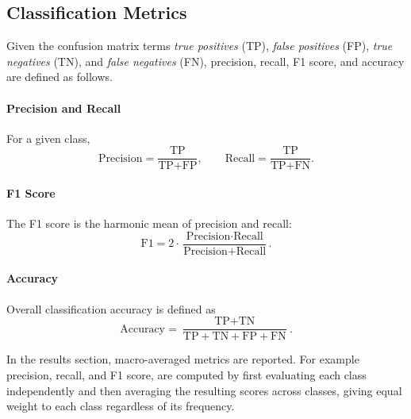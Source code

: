 \subsection{Classification Metrics}
Given the confusion matrix terms \emph{true positives} (TP), \emph{false
positives} (FP), \emph{true negatives} (TN), and \emph{false negatives} (FN),
precision, recall, F1 score, and accuracy are defined as follows.

\paragraph{Precision and Recall} For a given class,
\[
\text{Precision} = \frac{\text{TP}}{\text{TP} + \text{FP}},
\qquad
\text{Recall} = \frac{\text{TP}}{\text{TP} + \text{FN}}.
\]

\paragraph{F1 Score} The F1 score is the harmonic mean of precision and recall:
\[
\text{F1} = 2 \cdot \frac{\text{Precision} \cdot \text{Recall}}
{\text{Precision} + \text{Recall}}.
\]

\paragraph{Accuracy} Overall classification accuracy is defined as
\[
\text{Accuracy} = \frac{\text{TP} + \text{TN}}
{\text{TP} + \text{TN} + \text{FP} + \text{FN}}.
\]

In the results section, macro-averaged metrics are reported. For example precision, recall, and F1 score, are computed by first evaluating each class independently and then averaging the resulting scores across classes, giving equal weight to each class regardless of its frequency.
